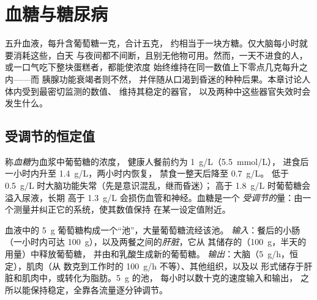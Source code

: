 \chapter{血糖与糖尿病}\label{ch:g12:glucose-and-diabetes}

五升血液，每升含葡萄糖一克，合计五克，
约相当于一块方糖。仅大脑每小时就要消耗这些，白天
与夜间都不间断，且别无他物可用。然而，一天不进食的人，
或一口气吃下整块蛋糕者，都能使浓度
始终维持在同一数值上下零点几克每升之内——而
胰腺功能衰竭者则不然，
并伴随从口渴到昏迷的种种后果。本章讨论人体内受到最密切监测的数值、
维持其稳定的器官，
以及两种中这些器官失效时会发生什么。

\section{受调节的恒定值}

\begin{definition}[血糖]\label{def:g12:glucose-and-diabetes:glycaemia}
称\emph{血糖}为血浆中葡萄糖的浓度，
健康人餐前约为 \qty{1}{g/L}（\qty{5.5}{mmol/L}），
进食后一小时内升至 \qty{1.4}{g/L}，两小时内恢复，
禁食一整天后降至 \qty{0.7}{g/L}。
低于 \qty{0.5}{g/L} 时大脑功能失常（先是意识混乱，继而昏迷）；
高于 \qty{1.8}{g/L} 时葡萄糖会溢入尿液，长期
高于 \qty{1.3}{g/L} 会损伤血管和神经。血糖是一个
\emph{受调节的}量：由一个测量并纠正它的系统，使其数值保持
在某一设定值附近。
\end{definition}

\begin{proposition}[葡萄糖池及其通量]\label{prop:g12:glucose-and-diabetes:pool}
血液中的 \qty{5}{g} 葡萄糖构成一个“池”，大量葡萄糖流经该池。
\emph{输入}：餐后的小肠（一小时内可达
\qty{100}{g}），以及两餐之间的\emph{肝脏}，它从
其储存的\emph{}（\qty{100}{g}，半天的用量）中释放葡萄糖，
并由和乳酸生成新的葡萄糖。
\emph{输出}：大脑（\qty{5}{g/h}，恒定），肌肉（从
数克到工作时的 \qty{100}{g/h} 不等）、其他组织，以及以
形式储存于肝脏和肌肉中，或转化为脂肪。\qty{5}{g} 的池，
每小时以数十克的速度输入和输出，
之所以能保持稳定，全靠各流量逐分钟调节。
\end{proposition}
\admitted

